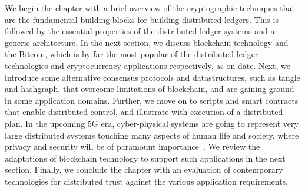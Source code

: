 We begin the chapter with a brief overview of the cryptographic techniques that are the fundamental building blocks for building 
distributed ledgers. This is followed by the essential properties of the distributed ledger systems and a generic architecture. 
In the next section, we discuss blockchain technology and the Bitcoin, which is by far the most popular of the distributed ledger 
technologies and cryptocurrency applications respectively, as on date. Next, we introduce some alternative consensus protocols 
and datastructures, such as tangle and hashgraph, that overcome limitations of blockchain, and are gaining ground in some application 
domains. Further, we move on to scripts and smart contracts that enable distributed control, and illustrate with execution of a 
distributed plan. In the upcoming 5G era, cyber-physical systems are going to represent very large distributed systems touching 
many aspects of human life and society, where privacy and security will be of paramount importance~\citep{Fan:2018}. We review the 
adaptations of blockchain technology to support such applications in the next section. 
Finally, we conclude the chapter with an evaluation of contemporary technologies for distributed trust against the various application 
requirements.









